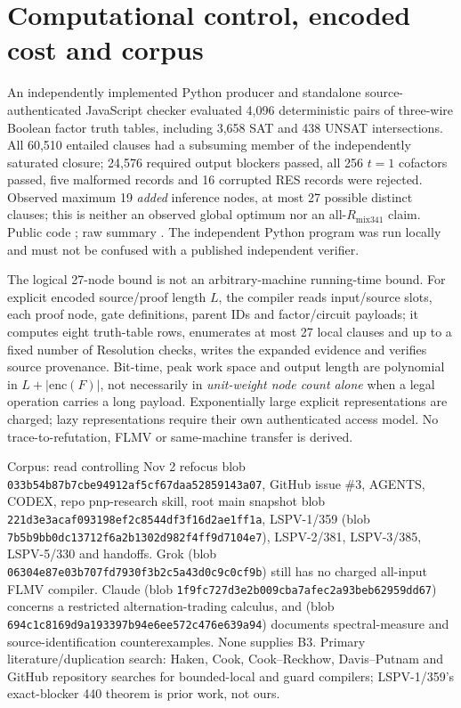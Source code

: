 \documentclass[11pt]{article}
\begin{document}
\section*{Computational control, encoded cost and corpus}
An independently implemented Python producer and standalone source-authenticated JavaScript checker evaluated 4,096 deterministic pairs of three-wire Boolean factor truth tables, including 3,658 SAT and 438 UNSAT intersections. All 60,510 entailed clauses had a subsuming member of the independently saturated closure; 24,576 required output blockers passed, all 256 $t=1$ cofactors passed, five malformed records and 16 corrupted RES records were rejected. Observed maximum 19 \emph{added} inference nodes, at most 27 possible distinct clauses; this is neither an observed global optimum nor an all-$R_{\mathrm{mix341}}$ claim. Public code ; raw summary . The independent Python program was run locally and must not be confused with a published independent verifier.

The logical 27-node bound is not an arbitrary-machine running-time bound. For explicit encoded source/proof length $L$, the compiler reads input/source slots, each proof node, gate definitions, parent IDs and factor/circuit payloads; it computes eight truth-table rows, enumerates at most 27 local clauses and up to a fixed number of Resolution checks, writes the expanded evidence and verifies source provenance. Bit-time, peak work space and output length are polynomial in $L+|\mathrm{enc}(F)|$, not necessarily in \emph{unit-weight node count alone} when a legal operation carries a long payload. Exponentially large explicit representations are charged; lazy representations require their own authenticated access model. No trace-to-refutation, FLMV or same-machine transfer is derived.

Corpus: read controlling Nov 2 refocus blob \texttt{033b54b87b7cbe94912af5cf67daa52859143a07}, GitHub issue \#3, AGENTS, CODEX, repo pnp-research skill, root main snapshot blob \texttt{221d3e3acaf093198ef2c8544df3f16d2ae1ff1a}, LSPV-1/359 (blob \texttt{7b5b9bb0dc13712f6a2b1302d982f4ff9d7104e7}), LSPV-2/381, LSPV-3/385, LSPV-5/330 and handoffs. Grok  (blob \texttt{06304e87e03b707fd7930f3b2c5a43d0c9c0cf9b}) still has no charged all-input FLMV compiler. Claude  (blob \texttt{1f9fc727d3e2b009cba7afec2a93beb62959dd67}) concerns a restricted alternation-trading calculus, and  (blob \texttt{694c1c8169d9a193397b94e6ee572c476e639a94}) documents spectral-measure and source-identification counterexamples. None supplies B3. Primary literature/duplication search: Haken, Cook, Cook--Reckhow, Davis--Putnam and GitHub repository searches for bounded-local and guard compilers; LSPV-1/359's exact-blocker 440 theorem is prior work, not ours.
\end{document}
